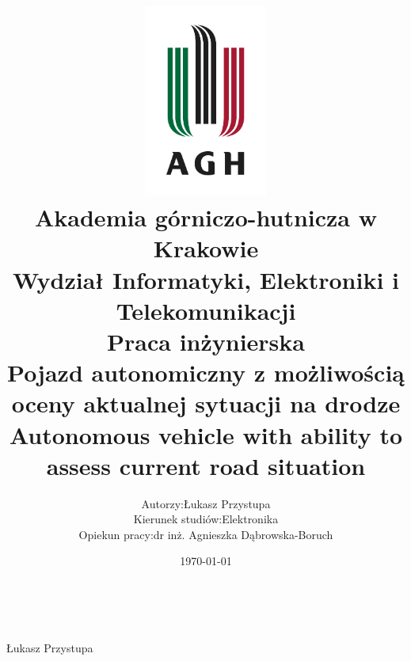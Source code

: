 \documentclass[12pt]{article}
\title{
    \includegraphics[width = 0.3\textwidth]{agh_logo.jpg}\\
    \textbf{Akademia górniczo-hutnicza w Krakowie}\\
    Wydział Informatyki, Elektroniki i  Telekomunikacji\\\vspace{2cm}
    \textbf{Praca inżynierska}\\
    Pojazd autonomiczny z możliwością oceny aktualnej sytuacji na drodze\\\vspace{1cm}
    \small{Autonomous vehicle with ability to assess current road situation}
}
\author{
    \begin{tabularx}{\textwidth}{l l}
    Autorzy: &Łukasz Przystupa\\
    Kierunek studiów: & Elektronika\\
    Opiekun pracy: &dr inż. Agnieszka Dąbrowska-Boruch
    \end{tabularx}
}
\date{\vspace{2cm}\today}
\numberwithin{equation}{section}
\begin{document}
    \begin{titlepage}
        \maketitle
        \thispagestyle{empty}
        \newpage
        \ 
        \thispagestyle{empty}
    \end{titlepage}
    
        
        \tableofcontents
        \newpage
    
    
    
    
    
    

    \vfill
    \begin{flushright}
        Łukasz Przystupa
    \end{flushright}

    \newpage
    \nocite{*}
    \printbibliography
\end{document}

